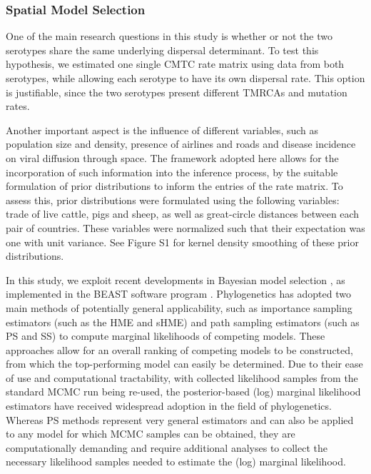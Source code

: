 \documentclass[10pt]{article}
\begin{document}
\subsubsection*{Spatial Model Selection}

One of the main research questions in this study is whether or not the two serotypes share the same underlying dispersal determinant. 
To test this hypothesis, we estimated one single CMTC rate matrix using data from both serotypes, while allowing each serotype to have its own dispersal rate. 
This option is justifiable, since the two serotypes present different TMRCAs and mutation rates. 

Another important aspect is the influence of different variables, such as population size and density, presence of airlines and roads and disease incidence on viral diffusion through space. 
The framework adopted here allows for the incorporation of such information into the inference process, by the suitable formulation of prior distributions to inform the entries of the rate matrix. 
To assess this, prior distributions were formulated using the following variables: trade of live cattle, pigs and sheep, as well as great-circle distances between each pair of countries. 
These variables were normalized such that their expectation was one with unit variance. See Figure S1 for kernel density smoothing of these prior distributions.

In this study, we exploit recent developments in Bayesian model selection \cite{Baele2012}, as implemented in the BEAST software program \cite{BEAST}.
Phylogenetics has adopted two main methods of potentially general applicability, such as importance sampling estimators (such as the HME and sHME) and path sampling estimators (such as PS and SS) to compute marginal likelihoods of competing models.
These approaches allow for an overall ranking of competing models to be constructed, from which the top-performing model can easily be determined.
Due to their ease of use and computational tractability, with collected likelihood samples from the standard MCMC run being re-used, the posterior-based (log) marginal likelihood estimators have received widespread adoption in the field of phylogenetics.
Whereas PS methods represent very general estimators and can also be applied to any model for which MCMC samples can be obtained, they are computationally demanding and require additional analyses to collect the necessary likelihood samples needed to estimate the (log) marginal likelihood.
\end{document}
